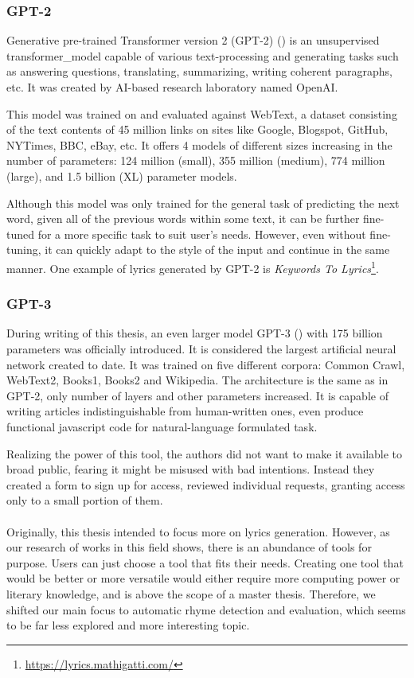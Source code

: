 \subsubsection*{GPT-2}
Generative pre-trained Transformer version 2 (GPT-2) (\cite{radford2019gpt2}) is an unsupervised \gls{transformer_model} capable of various text-processing and generating tasks such as answering questions, translating, summarizing, writing coherent paragraphs, etc. It was created by AI-based research laboratory named OpenAI.

This model was trained on and evaluated against WebText, a dataset consisting of the text contents of 45 million links on sites like Google, Blogspot, GitHub, NYTimes, BBC, eBay, etc. It offers 4 models of different sizes increasing in the number of parameters: 124 million (small), 355 million (medium), 774 million (large), and 1.5 billion (XL) parameter models.

Although this model was only trained for the general task of predicting the next word, given all of the previous words within some text, it can be further fine-tuned for a more specific task to suit user's needs. However, even without fine-tuning, it can quickly adapt to the style of the input and continue in the same manner. One example of lyrics generated by GPT-2 is \textit{Keywords To Lyrics}\footnote{\url{https://lyrics.mathigatti.com/}}.

\subsubsection*{GPT-3}
During writing of this thesis, an even larger model GPT-3 (\cite{brown2020gpt3}) with 175 billion parameters was officially introduced. It is considered the largest artificial neural network created to date. It was trained on five different corpora: Common Crawl, WebText2, Books1, Books2 and Wikipedia. The architecture is the same as in GPT-2, only number of layers and other parameters increased. It is capable of writing articles indistinguishable from human-written ones, even produce functional javascript code for natural-language formulated task.

Realizing the power of this tool, the authors did not want to make it available to broad public, fearing it might be misused with bad intentions. Instead they created a form to sign up for access, reviewed individual requests, granting access only to a small portion of them.



\paragraph{}Originally, this thesis intended to focus more on lyrics generation. However, as our research of works in this field shows, there is an abundance of tools for purpose. Users can just choose a tool that fits their needs. Creating one tool that would be better or more versatile would either require more computing power or literary knowledge, and is above the scope of a master thesis. Therefore, we shifted our main focus to automatic rhyme detection and evaluation, which seems to be far less explored and more interesting topic.


